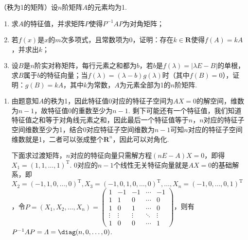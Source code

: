 \begin{exercise}
\begin{exgroup}
        \item （秩为1的矩阵）设$n$阶矩阵$A$的元素均为1.
        \begin{enumerate}
            \item 求$A$的特征值，并求矩阵$P$使得$P^{-1}AP$为对角矩阵；

            \item 若$f(x)$是$x$的$m$次多项式，且常数项为0，证明：存在$k\in\mathbf{R}$使得$f(A)=kA$，并求出$k$；

            \item 设$B$是$n$阶实对称矩阵，每行元素之和都为$b$，若$b$是$f(\lambda)=|\lambda E-B|$的单根，求$B$属于$b$的特征向量；当$f(\lambda)=(\lambda-b)g(\lambda)$时（其中$f(B)=0$），证明：$g(B)=kA$，其中$k$为常数，$A$为元素全部为1的$n$阶矩阵.
        \end{enumerate}
        \begin{answer}
            \begin{enumerate}
                \item 由题意知$A$的秩为1，因此特征值0对应的特征子空间为$AX=0$的解空间，维数为$n-1$，故特征值0的重数至少为$n-1$. 剩下可能还有一个特征值，我们知道特征值之和等于对角线元素之和，因此最后一个特征值等于$n$，$n$对应的特征子空间维数至少为1，结合0对应特征子空间维数为$n-1$可知$n$对应的特征子空间维数就是1，二者可以张成整个$\mathbf{R}^n$，因此可以对角化.

                      下面求过渡矩阵，$n$对应的特征向量只需解方程$(nE-A)X=0$，即得$X_1=(1,1,\ldots,1)^\mathrm{T}$. 0对应的$n-1$个线性无关特征向量就是$AX=0$的基础解系，即$X_2=(-1,1,0,\ldots,0)^\mathrm{T},X_3=(-1,0,1,0,\ldots,0)^\mathrm{T},\ldots,X_n=(-1,0,\ldots,0,1)^\mathrm{T}$，令$P=(X_1,X_2,\ldots,X_n)=\begin{pmatrix}
                              1 & -1 & -1 & \cdots & -1 \\ 1 & 1 & 0 & \cdots & 0 \\ 1 & 0 & 1 & \cdots & 0 \\ \vdots & \vdots & \vdots & \ddots & \vdots \\ 1 & 0 & 0 & \cdots & 1
                          \end{pmatrix}$，则有$P^{-1}AP=\varLambda=\diag(n,0,\ldots,0)$.


\end{enumerate}
\end{answer}
\end{exgroup}
\end{exercise}

